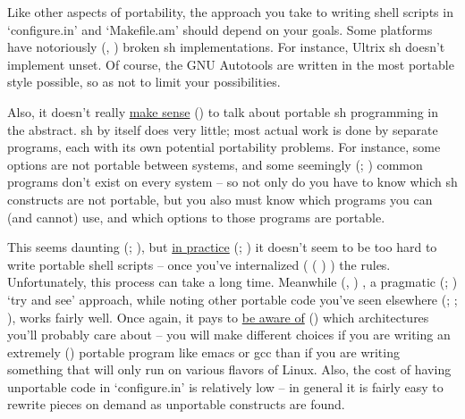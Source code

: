 Like other aspects of portability, the approach you take to writing shell scripts in `configure.in' and `Makefile.am' should depend on your goals. Some platforms have notoriously ({\MbQ{}}, {\McQ{}}) broken sh implementations. For instance, Ultrix sh doesn't implement unset. Of course, the GNU Autotools are written in the most portable style possible, so as not to limit your possibilities. 


Also, it doesn't really \underline{make sense} ({\MbQ{}})  to talk about 
portable sh programming in the abstract. sh by itself does very little; most 
actual work is done by separate programs, each with its own potential 
portability problems. For instance, some options are not portable between 
systems, and some seemingly ({\McQ{}}; {\MaQ{}}) common programs don't exist on 
every system -- so not only do you have to know which sh constructs are not 
portable, but you also must know which programs you can (and cannot) use, and 
which options to those programs are portable. 


This seems daunting ({\MaQ{}}; {\MaQ{}}), but
\underline{in practice} ({\MaQ{}}; {\MaQ{}}) it doesn't seem 
to be too hard to write portable shell scripts -- once you've 
internalized ({\MaQ{}} ({\McQ{}} {\MbQ{}}) {\MaQ{}}) the rules. Unfortunately,
this process can take a long time. Meanwhile ({\MaQ{}}, {\MaQ{}}) , a 
pragmatic ({\MaQ{}}; {\MaQ{}}) `try and see' approach, while noting other portable 
code you've seen elsewhere ({\MaQ{}}; {\MbQ{}}; {\MaQ{}}), works fairly well.
Once again, it pays to \underline{be aware of} ({\MbQ{}}) which architectures 
you'll probably care about -- you will make different choices if you are 
writing an extremely ({\McQ{}}) portable program like emacs or gcc than if you 
are writing something that will only run on various flavors of Linux. Also,
the cost of having unportable code in `configure.in' is relatively low -- in 
general it is fairly easy to rewrite pieces on demand as unportable constructs 
are found. 

